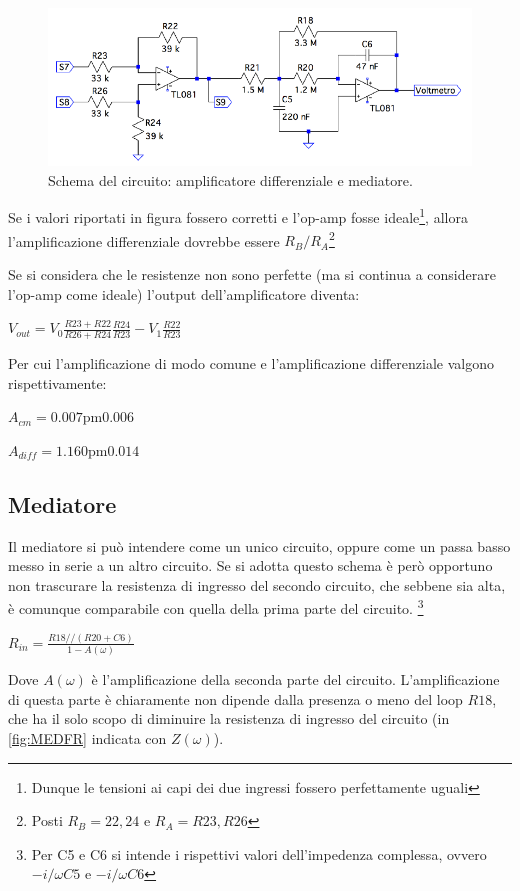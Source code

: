 \documentclass[a4paper,10pt]{article}
\begin{document}
\begin{figure}[H]
	\centering
	\includegraphics[width=\textwidth]{../grafici/DiffAmpAv.png}
	\caption{Schema del circuito: amplificatore differenziale e mediatore.}
	\label{fig:diffav}
\end{figure}

Se i valori riportati in figura fossero corretti e l'op-amp fosse ideale\footnote{Dunque le tensioni ai capi dei due ingressi fossero perfettamente uguali}, allora l'amplificazione differenziale dovrebbe essere $R_B/R_A$\footnote{Posti $R_B=22, 24$ e $R_A=R23, R26$}

Se si considera che le resistenze non sono perfette (ma si continua a considerare l'op-amp come ideale) l'output dell'amplificatore diventa:

$V_{out}=V_0\frac{R23+R22}{R26+R24}\frac{R24}{R23}-V_1\frac{R22}{R23}$

Per cui l'amplificazione di modo comune e l'amplificazione differenziale valgono rispettivamente:

$A_{cm}=\unit{0.007\pm 0.006}{}$

$A_{diff}=\unit{1.160 \pm 0.014}{}$ 

\subsection{Mediatore}

Il mediatore si può intendere come un unico circuito, oppure come un passa basso messo in serie a un altro circuito. Se si adotta questo schema è però opportuno non trascurare la resistenza di ingresso del secondo circuito, che sebbene sia alta, è comunque comparabile con quella della prima parte del circuito. \footnote{Per C5 e C6 si intende i rispettivi valori dell'impedenza complessa, ovvero $-i/\omega C5$ e $-i/\omega C6$}


$R_{in}=\frac{R18//(R20+C6)}{1-A(\omega)}$

Dove $A(\omega)$ è l'amplificazione della seconda parte del circuito.
L'amplificazione di questa parte è chiaramente non dipende dalla presenza o meno del loop $R18$, che ha il solo scopo di diminuire la resistenza di ingresso del circuito (in \cref{fig:MEDFR} indicata con $Z(\omega)$).
\end{document}
